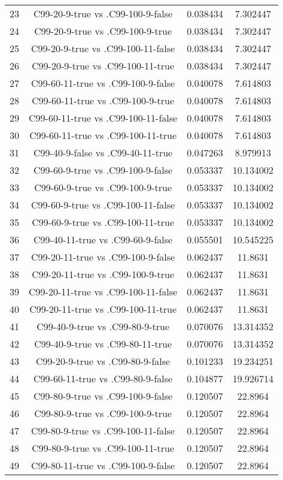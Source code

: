 \documentclass[a4paper,10pt]{article}
\begin{document}
\begin{landscape}
\begin{table}[!htp]
\begin{tabular}{cccc}
23&C99-20-9-true vs .C99-100-9-false&0.038434&7.302447\\
24&C99-20-9-true vs .C99-100-9-true&0.038434&7.302447\\
25&C99-20-9-true vs .C99-100-11-false&0.038434&7.302447\\
26&C99-20-9-true vs .C99-100-11-true&0.038434&7.302447\\
27&C99-60-11-true vs .C99-100-9-false&0.040078&7.614803\\
28&C99-60-11-true vs .C99-100-9-true&0.040078&7.614803\\
29&C99-60-11-true vs .C99-100-11-false&0.040078&7.614803\\
30&C99-60-11-true vs .C99-100-11-true&0.040078&7.614803\\
31&C99-40-9-false vs .C99-40-11-true&0.047263&8.979913\\
32&C99-60-9-true vs .C99-100-9-false&0.053337&10.134002\\
33&C99-60-9-true vs .C99-100-9-true&0.053337&10.134002\\
34&C99-60-9-true vs .C99-100-11-false&0.053337&10.134002\\
35&C99-60-9-true vs .C99-100-11-true&0.053337&10.134002\\
36&C99-40-11-true vs .C99-60-9-false&0.055501&10.545225\\
37&C99-20-11-true vs .C99-100-9-false&0.062437&11.8631\\
38&C99-20-11-true vs .C99-100-9-true&0.062437&11.8631\\
39&C99-20-11-true vs .C99-100-11-false&0.062437&11.8631\\
40&C99-20-11-true vs .C99-100-11-true&0.062437&11.8631\\
41&C99-40-9-true vs .C99-80-9-true&0.070076&13.314352\\
42&C99-40-9-true vs .C99-80-11-true&0.070076&13.314352\\
43&C99-20-9-true vs .C99-80-9-false&0.101233&19.234251\\
44&C99-60-11-true vs .C99-80-9-false&0.104877&19.926714\\
45&C99-80-9-true vs .C99-100-9-false&0.120507&22.8964\\
46&C99-80-9-true vs .C99-100-9-true&0.120507&22.8964\\
47&C99-80-9-true vs .C99-100-11-false&0.120507&22.8964\\
48&C99-80-9-true vs .C99-100-11-true&0.120507&22.8964\\
49&C99-80-11-true vs .C99-100-9-false&0.120507&22.8964\\

\end{tabular}
\end{table}
\end{landscape}
\end{document}
